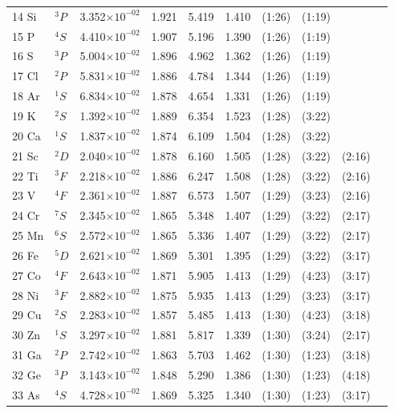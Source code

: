 \documentclass[12pt]{report}
\begin{document}
\begin{longtable}{l l r r r r r r r r}
14 Si & $^{3}P$ & 3.352$\times10^{-02}$ & 1.921 & 5.419 & 1.410 & (1:26) & (1:19)  \\
15 P & $^{4}S$ & 4.410$\times10^{-02}$ & 1.907 & 5.196 & 1.390 & (1:26) & (1:19)     \\
16 S & $^{3}P$ & 5.004$\times10^{-02}$ & 1.896 & 4.962 & 1.362 & (1:26) & (1:19)     \\
17 Cl & $^{2}P$ & 5.831$\times10^{-02}$ & 1.886 & 4.784 & 1.344 & (1:26) & (1:19)     \\
18 Ar & $^{1}S$ & 6.834$\times10^{-02}$ & 1.878 & 4.654 & 1.331 & (1:26) & (1:19)     \\
19 K & $^{2}S$ & 1.392$\times10^{-02}$ & 1.889 & 6.354 & 1.523 & (1:28) & (3:22)     \\
20 Ca & $^{1}S$ & 1.837$\times10^{-02}$ & 1.874 & 6.109 & 1.504 & (1:28) & (3:22)     \\
21 Sc & $^{2}D$ & 2.040$\times10^{-02}$ & 1.878 & 6.160 & 1.505 & (1:28) & (3:22) & (2:16)   \\
22 Ti & $^{3}F$ & 2.218$\times10^{-02}$ & 1.886 & 6.247 & 1.508 & (1:28) & (3:22) & (2:16)   \\
23 V & $^{4}F$ & 2.361$\times10^{-02}$ & 1.887 & 6.573 & 1.507 & (1:29) & (3:23) & (2:16)   \\
24 Cr & $^{7}S$ & 2.345$\times10^{-02}$ & 1.865 & 5.348 & 1.407 & (1:29) & (3:22) & (2:17)   \\
25 Mn & $^{6}S$ & 2.572$\times10^{-02}$ & 1.865 & 5.336 & 1.407 & (1:29) & (3:22) & (2:17)   \\
26 Fe & $^{5}D$ & 2.621$\times10^{-02}$ & 1.869 & 5.301 & 1.395 & (1:29) & (3:22) & (3:17)   \\
27 Co & $^{4}F$ & 2.643$\times10^{-02}$ & 1.871 & 5.905 & 1.413 & (1:29) & (4:23) & (3:17)   \\
28 Ni & $^{3}F$ & 2.882$\times10^{-02}$ & 1.875 & 5.935 & 1.413 & (1:29) & (3:23) & (3:17)   \\
29 Cu & $^{2}S$ & 2.283$\times10^{-02}$ & 1.857 & 5.485 & 1.413 & (1:30) & (4:23) & (3:18)   \\
30 Zn & $^{1}S$ & 3.297$\times10^{-02}$ & 1.881 & 5.817 & 1.339 & (1:30) & (3:24) & (2:17)   \\
31 Ga & $^{2}P$ & 2.742$\times10^{-02}$ & 1.863 & 5.703 & 1.462 & (1:30) & (1:23) & (3:18)   \\
32 Ge & $^{3}P$ & 3.143$\times10^{-02}$ & 1.848 & 5.290 & 1.386 & (1:30) & (1:23) & (4:18)   \\
33 As & $^{4}S$ & 4.728$\times10^{-02}$ & 1.869 & 5.325 & 1.340 & (1:30) & (1:23) & (3:17)   \\

\end{longtable}
\end{document}
